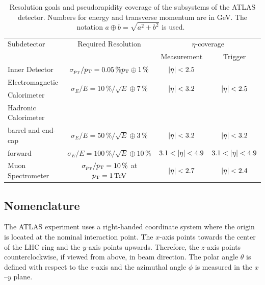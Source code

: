 \begin{table}[htpb]
    \centering
    \caption{Resolution goals and pseudorapidity coverage of the subsystems of the ATLAS detector.
            Numbers for energy and transverse momentum are in GeV.
            The notation $a \oplus b = \sqrt{a^2 + b^2}$ is used.~\cite{ATLAS}}\label{tab:setup:resolution}
    {\small
    \begin{tabular}{@{}lccc@{}}
        \toprule
        Subdetector & Required Resolution & \multicolumn{2}{c}{$\eta$-coverage}   \\
                    &                     & Measurement & Trigger \\ \midrule
        Inner Detector & $\sigma_{p_\text{T}} / p_\text{T} = 0.05\,\% p_\text{T} \oplus 1\,\%$ & $\left|\eta\right| < 2.5$ & \\ \cmidrule{0-3}
        Electromagnetic & \multirow{2}{*}{$\sigma_E / E = 10\,\% / \sqrt{E} \oplus 7\,\%$} & \multirow{2}{*}{$\left|\eta\right| < 3.2$} & \multirow{2}{*}{$\left|\eta\right| < 2.5$} \\
        Calorimeter & & & \\ \cmidrule{0-3}
        Hadronic Calorimeter & & & \\
        \quad barrel and end-cap & $\sigma_E / E = 50\,\% / \sqrt{E} \oplus 3\,\% $ & $\left|\eta\right| < 3.2$ & $\left|\eta\right| < 3.2$ \\
        \quad forward & $\sigma_E / E = 100\,\% / \sqrt{E} \oplus 10\,\% $ & $3.1 < \left|\eta\right| < 4.9$ & $3.1 < \left|\eta\right| < 4.9$ \\ \cmidrule{0-3}
        Muon Spectrometer & $\sigma_{p_\text{T}} / p_\text{T} = 10\,\%$ at $\pt = \unit[1]{TeV}$ & $\left|\eta\right| < 2.7$ & $\left|\eta\right| < 2.4$ \\ \bottomrule
    \end{tabular}
    }
\end{table}


\subsection{Nomenclature}\label{sub:setup:nomenclature}

The ATLAS experiment uses a right-handed coordinate system where the origin is located at the nominal interaction point.
The $x$-axis points towards the center of the LHC ring and the $y$-axis points upwards.
Therefore, the $z$-axis points counterclockwise, if viewed from above, in beam direction.
The polar angle $\theta$ is defined with respect to the $z$-axis and the azimuthal angle $\phi$ is measured
in the $x$\nobreakdash--$y$ plane.

